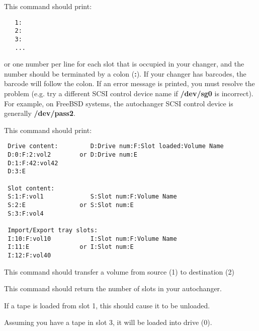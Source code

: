 This command should print:

\footnotesize
\begin{verbatim}
   1:
   2:
   3:
   ...

\end{verbatim}
\normalsize

or one number per line for each slot that is  occupied in your changer, and
the number should be  terminated by a colon ({\bf :}). If your changer has
barcodes, the barcode will follow the colon.  If an error message is printed,
you must resolve the  problem (e.g. try a different SCSI control device name
if {\bf /dev/sg0}  is incorrect). For example, on FreeBSD systems, the
autochanger  SCSI control device is generally {\bf /dev/pass2}.


This command should print:

\footnotesize
\begin{verbatim}
 Drive content:         D:Drive num:F:Slot loaded:Volume Name
 D:0:F:2:vol2        or D:Drive num:E
 D:1:F:42:vol42
 D:3:E

 Slot content:
 S:1:F:vol1             S:Slot num:F:Volume Name
 S:2:E               or S:Slot num:E
 S:3:F:vol4

 Import/Export tray slots:
 I:10:F:vol10           I:Slot num:F:Volume Name
 I:11:E              or I:Slot num:E
 I:12:F:vol40

\end{verbatim}
\normalsize


This command should transfer a volume from source (1) to destination (2)


This command should return the number of slots in your autochanger.


   If a tape is loaded from slot 1, this should cause it to be unloaded.


Assuming you have a tape in slot 3,  it will be loaded into drive (0).


